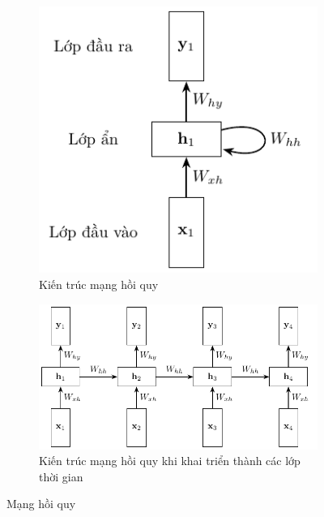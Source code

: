 \begin{figure}[htb]
    \centering
    \begin{subfigure}[t]{0.33\textwidth}
        \includegraphics[width=\textwidth]{tikz_image/rnn_loop_architecture.pdf}
        \caption{Kiến trúc mạng hồi quy}
        \label{figure:rnn-loop-architecture}
    \end{subfigure}
    \begin{subfigure}[t]{0.66\textwidth}
        \centering
        \includegraphics[width=\textwidth]{tikz_image/rnn_layer_architecture.pdf}
        \caption{Kiến trúc mạng hồi quy khi khai triển thành các lớp thời gian}
        \label{figure:rnn-layer-architecture}
    \end{subfigure}
    \caption{Mạng hồi quy \cite{Aggarwal2023-zk}}
\end{figure}
